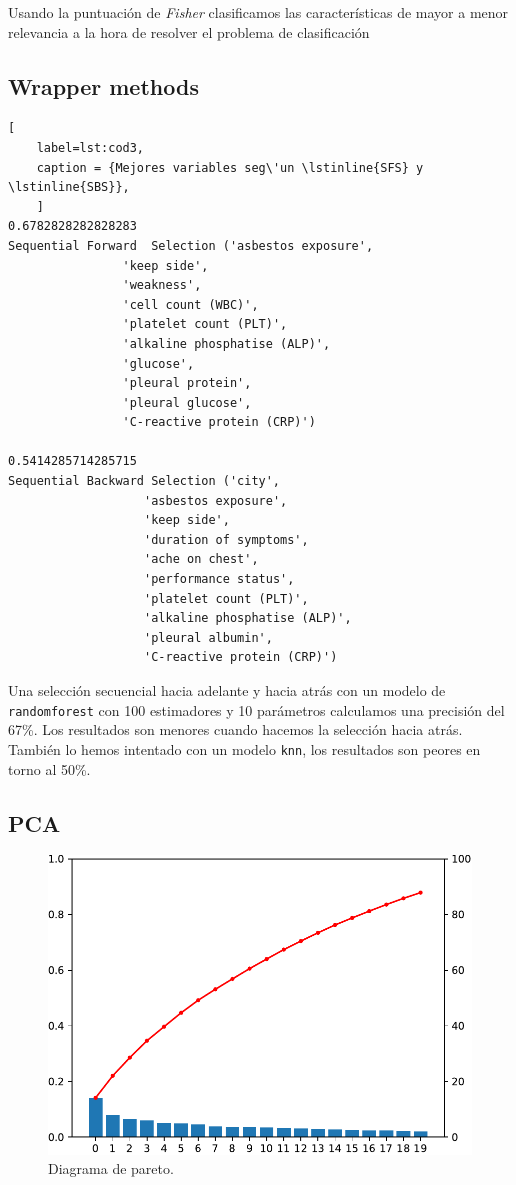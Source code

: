 \documentclass{article}
\begin{document}
Usando la puntuación de \textit{Fisher} clasificamos las
características de mayor a menor relevancia a la hora de resolver el
problema de clasificación

\newpage
\subsection{Wrapper methods}
\begin{lstlisting}[
	label=lst:cod3,
	caption = {Mejores variables seg\'un \lstinline{SFS} y \lstinline{SBS}},
	]
0.6782828282828283
Sequential Forward  Selection ('asbestos exposure',
				'keep side',
				'weakness',
				'cell count (WBC)',
				'platelet count (PLT)',
				'alkaline phosphatise (ALP)',
				'glucose',
				'pleural protein',
				'pleural glucose',
				'C-reactive protein (CRP)')

0.5414285714285715
Sequential Backward Selection ('city',
			       'asbestos exposure',
			       'keep side',
			       'duration of symptoms',
			       'ache on chest',
			       'performance status',
			       'platelet count (PLT)',
			       'alkaline phosphatise (ALP)',
			       'pleural albumin',
			       'C-reactive protein (CRP)')
\end{lstlisting}

Una selección secuencial hacia adelante y hacia atrás con un modelo de
\lstinline{randomforest} con 100 estimadores y 10 parámetros
calculamos una precisión del 67\%. Los resultados son menores cuando
hacemos la selección hacia atrás. También lo hemos intentado con un
modelo \lstinline{knn}, los resultados son peores en torno al 50\%.

\newpage
\subsection{PCA}

\begin{figure}[h]
\centering
\includegraphics[width = 0.9\linewidth]{../images/pareto.pdf}
\caption{Diagrama de pareto.}
\end{figure}
\end{document}
